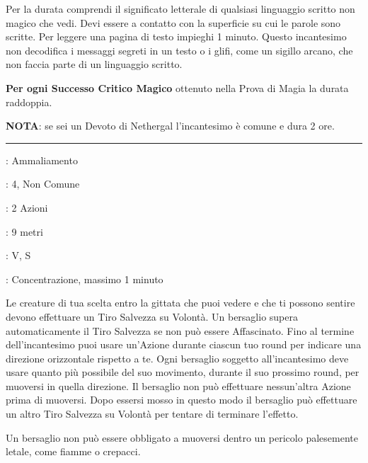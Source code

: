 \begin{multicols}{2}
Per la durata comprendi il significato letterale di qualsiasi linguaggio scritto non magico che vedi. Devi essere a contatto con la superficie su cui le parole sono scritte. Per leggere una pagina di testo impieghi 1 minuto. Questo incantesimo non decodifica i messaggi segreti in un testo o i glifi, come un sigillo arcano, che non faccia parte di un linguaggio scritto.

\textbf{Per ogni Successo Critico Magico} ottenuto nella Prova di Magia la durata raddoppia.

\textbf{NOTA}: se sei un Devoto di Nethergal l'incantesimo è comune e dura 2 ore.

\smallskip\noindent\rule{\linewidth}{2pt} \hypertarget{Compulsione}{}\medskip{}
\noindent
\begin{description}[noitemsep, topsep=0pt, parsep=0pt, partopsep=0pt, leftmargin=0cm, labelwidth=2.8cm]
	\item[\textbf{Lista di Magia}]: Ammaliamento
	\item[\textbf{Livello}]: 4, Non Comune
	\item[\textbf{T. di Lancio}]: 2 Azioni
	\item[\textbf{Gittata}]: 9 metri
	\item[\textbf{Componenti}]: V, S
	\item[\textbf{Durata}]: Concentrazione, massimo 1 minuto
\end{description}

Le creature di tua scelta entro la gittata che puoi vedere e che ti possono sentire devono effettuare un Tiro Salvezza su Volontà. Un bersaglio supera automaticamente il Tiro Salvezza se non può essere Affascinato. Fino al termine dell'incantesimo puoi usare un'Azione durante ciascun tuo round per indicare una direzione orizzontale rispetto a te. Ogni bersaglio soggetto all'incantesimo deve usare quanto più possibile del suo movimento, durante il suo prossimo round, per muoversi in quella direzione. Il bersaglio non può effettuare nessun'altra Azione prima di muoversi. Dopo essersi mosso in questo modo il bersaglio può effettuare un altro Tiro Salvezza su Volontà per tentare di terminare l'effetto.

Un bersaglio non può essere obbligato a muoversi dentro un pericolo palesemente letale, come fiamme o crepacci.


\end{multicols}
